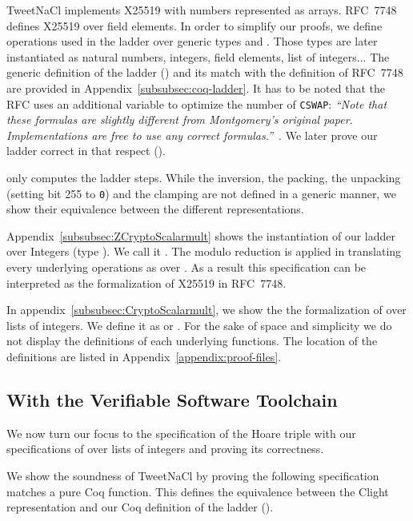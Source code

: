 TweetNaCl implements X25519 with numbers represented as arrays.
RFC~7748 defines X25519 over field elements. In order to simplify our proofs,
we define operations used in the ladder over generic types
 and . Those types are later instantiated as natural numbers,
integers, field elements, list of integers...
The generic definition of the ladder () and its match with
the definition of RFC~7748 are provided in Appendix~\ref{subsubsec:coq-ladder}.
It has to be noted that the RFC uses an additional variable to optimize the number
of \texttt{CSWAP}:
\emph{``Note that these formulas are slightly different from Montgomery's
original paper.  Implementations are free to use any correct formulas.''}~\cite{rfc7748}.
We later prove our ladder correct in that respect ().

 only computes the ladder steps.
While the inversion, the packing, the unpacking (setting bit 255 to \texttt{0})
and the clamping are not defined in a generic manner, we show their equivalence
between the different representations.

Appendix~\ref{subsubsec:ZCryptoScalarmult} shows the instantiation of our ladder
over Integers (type ). We call it .
The modulo reduction is applied in  translating every
underlying operations as over \Zfield. As a result this specification can be
interpreted as the formalization of X25519 in RFC~7748.

In appendix~\ref{subsubsec:CryptoScalarmult}, we show the the formalization of
 over lists of integers. We define it as
 or . For the sake of space and simplicity we
do not display the definitions of each underlying functions.
The location of the definitions are listed in Appendix~\ref{appendix:proof-files}.

\subsection{With the Verifiable Software Toolchain}
\label{subsec:with-VST}

We now turn our focus to the specification of the Hoare triple with our
specifications of  over lists of integers and proving
its correctness.

We show the soundness of TweetNaCl by proving the following specification matches
a pure Coq function.
This defines the equivalence between the Clight representation and our Coq
definition of the ladder ().

